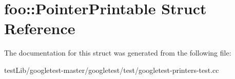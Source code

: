 \hypertarget{structfoo_1_1PointerPrintable}{}\section{foo\+:\+:Pointer\+Printable Struct Reference}
\label{structfoo_1_1PointerPrintable}


The documentation for this struct was generated from the following file\+:\begin{DoxyCompactItemize}
\item 
test\+Lib/googletest-\/master/googletest/test/googletest-\/printers-\/test.\+cc\end{DoxyCompactItemize}
